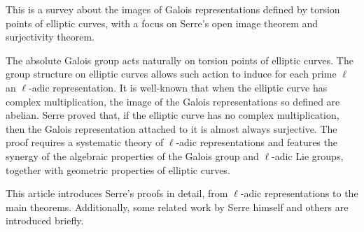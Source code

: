 This is a survey about the images of Galois representations defined by torsion points of elliptic curves, with a focus on Serre’s open image theorem and surjectivity theorem.

The absolute Galois group acts naturally on torsion points of elliptic curves. The group structure on elliptic curves allows such action to induce for each prime $\ell$ an $\ell$-adic representation.
It is well-known that when the elliptic curve has complex multiplication, the image of the Galois representations so defined are abelian.
Serre proved that, if the elliptic curve has no complex multiplication, then the Galois representation attached to it is almost always surjective.
The proof requires a systematic theory of $\ell$-adic representations and features the synergy of the algebraic properties of the Galois group and $\ell$-adic Lie groups, together with geometric properties of elliptic curves.

This article introduces Serre’s proofs in detail, from $\ell$-adic representations to the main theorems. Additionally, some related work by Serre himself and others are introduced briefly.
